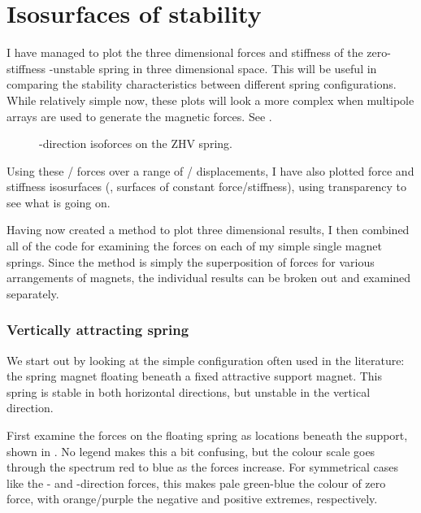 \section{Isosurfaces of stability}

I have managed to plot the three dimensional forces and stiffness of
the zero-stiffness \x-unstable spring in three dimensional space. This
will be useful in comparing the stability characteristics between
different spring configurations. While relatively simple now, these
plots will look a more complex when multipole arrays are used to
generate the magnetic forces. See .

\begin{figure}
   \centering
   \caption{\x-direction isoforces on the ZHV spring.}
\end{figure}

Using these \threeD/ forces over a range of \threeD/ displacements, I have
also plotted force and stiffness isosurfaces (\ie, surfaces of constant
force/stiffness), using transparency to see what is going on.

Having now created a method to plot three dimensional results, I then combined
all of the code for examining the forces on each of my simple single magnet
springs. Since the method is simply the superposition of forces for various
arrangements of magnets, the individual results can be broken out and examined
separately.

\subsubsection{Vertically attracting spring}

We start out by looking at the simple configuration often used in the
literature: the spring magnet floating beneath a fixed attractive support
magnet. This spring is stable in both horizontal directions, but unstable in
the vertical direction.

First examine the forces on the floating spring as locations beneath the
support, shown in . No legend makes this a bit confusing,
but the colour scale goes through the spectrum red to blue as the forces
increase. For symmetrical cases like the \x- and \y-direction forces, this
makes pale green-blue the colour of zero force, with orange/purple the
negative and positive extremes, respectively.

